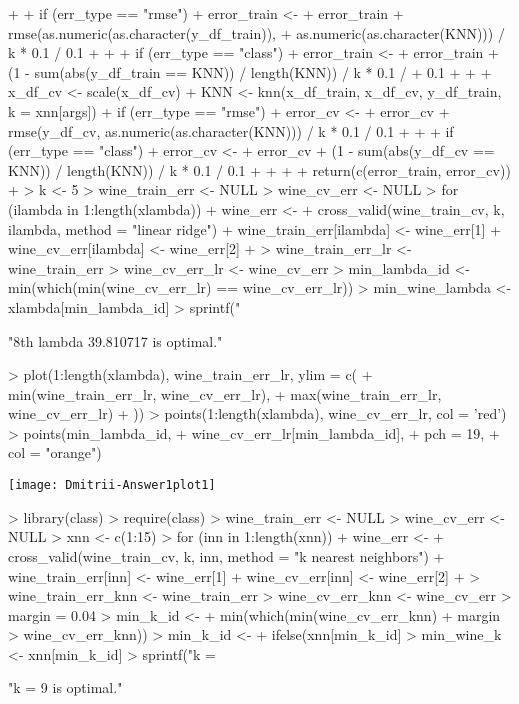 \documentclass{article}
\begin{document}
\begin{Schunk}
\begin{Sinput}
{{{+         
+         if (err_type == "rmse") {
+           error_train <-
+             error_train + rmse(as.numeric(as.character(y_df_train)),
+                                as.numeric(as.character(KNN))) / k * 0.1 / 0.1
+         }
+         
+         if (err_type == "class") {
+           error_train <-
+             error_train + (1 - sum(abs(y_df_train == KNN)) / length(KNN)) / k * 0.1 /
+             0.1
+         }
+         
+         x_df_cv <- scale(x_df_cv)
+         KNN <- knn(x_df_train, x_df_cv, y_df_train, k = xnn[args])
+         if (err_type == "rmse") {
+           error_cv <-
+             error_cv + rmse(y_df_cv, as.numeric(as.character(KNN))) / k * 0.1 / 0.1
+         }
+         
+         if (err_type == "class") {
+           error_cv <-
+             error_cv + (1 - sum(abs(y_df_cv == KNN)) / length(KNN)) / k * 0.1 / 0.1
+         }
+       }
+     }
+     return(c(error_train, error_cv))
+   }
> k <- 5
> wine_train_err <- NULL
> wine_cv_err <- NULL
> for (ilambda in 1:length(xlambda)) {
+   wine_err <-
+     cross_valid(wine_train_cv, k, ilambda, method = "linear ridge")
+   wine_train_err[ilambda] <- wine_err[1]
+   wine_cv_err[ilambda] <- wine_err[2]
+ }
> wine_train_err_lr <- wine_train_err
> wine_cv_err_lr <- wine_cv_err
> min_lambda_id <- min(which(min(wine_cv_err_lr) == wine_cv_err_lr))
> min_wine_lambda <- xlambda[min_lambda_id]
> sprintf("%dth lambda %f is optimal.", min_lambda_id, min_wine_lambda)
\end{Sinput}
\begin{Soutput}
[1] "8th lambda 39.810717 is optimal."
\end{Soutput}
\end{Schunk}
\begin{Schunk}
\begin{Sinput}
> plot(1:length(xlambda), wine_train_err_lr, ylim = c(
+   min(wine_train_err_lr, wine_cv_err_lr),
+   max(wine_train_err_lr, wine_cv_err_lr)
+ ))
> points(1:length(xlambda), wine_cv_err_lr, col = 'red')
> points(min_lambda_id,
+        wine_cv_err_lr[min_lambda_id],
+        pch = 19,
+        col = "orange")
\end{Sinput}
\end{Schunk}
\texttt{[image: Dmitrii-Answer1plot1]}
\begin{Schunk}
\begin{Sinput}
> library(class)
> require(class)
> wine_train_err <- NULL
> wine_cv_err <- NULL
> xnn <- c(1:15)
> for (inn in 1:length(xnn)) {
+   wine_err <-
+     cross_valid(wine_train_cv, k, inn, method = "k nearest neighbors")
+   wine_train_err[inn] <- wine_err[1]
+   wine_cv_err[inn] <- wine_err[2]
+ }
> wine_train_err_knn <- wine_train_err
> wine_cv_err_knn <- wine_cv_err
> margin = 0.04
> min_k_id <-
+   min(which(min(wine_cv_err_knn) + margin > wine_cv_err_knn))
> min_k_id <-
+   ifelse(xnn[min_k_id] %% 2, min_k_id, min_k_id + 1) # K must be odd
> min_wine_k <- xnn[min_k_id]
> sprintf("k = %d is optimal.", min_wine_k)
\end{Sinput}
\begin{Soutput}
[1] "k = 9 is optimal."
\end{Soutput}
\end{Schunk}
\end{document}
